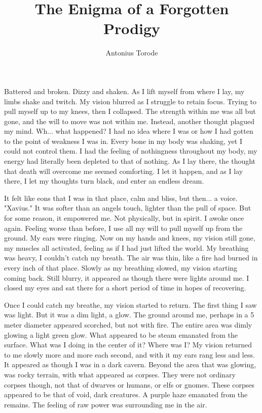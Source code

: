 \documentclass[11pt]{article}
\title{The Enigma of a Forgotten Prodigy}
\author{Antonius Torode}
\begin{document}
\maketitle
\thispagestyle{fancy}

Battered and broken. Dizzy and shaken. As I lift myself from where I lay, my limbs shake and twitch. My vision blurred as I struggle to retain focus. Trying to pull myself up to my knees, then I collapsed. The strength within me was all but gone, and the will to move was not within me. Instead, another thought plagued my mind. Wh... what happened? I had no idea where I was or how I had gotten to the point of weakness I was in. Every bone in my body was shaking, yet I could not control them. I had the feeling of nothingness throughout my body, my energy had literally been depleted to that of nothing. As I lay there, the thought that death will overcome me seemed comforting. I let it happen, and as I lay there, I let my thoughts turn black, and enter an endless dream. 

It felt like eons that I was in that place, calm and bliss, but then... a voice. "Xavius." It was softer than an angels touch, lighter than the pull of space. But for some reason, it empowered me. Not physically, but in spirit. I awoke once again. Feeling worse than before, I use all my will to pull myself up from the ground. My ears were ringing. Now on my hands and knees, my vision still gone, my muscles all activated, feeling as if I had just lifted the world. My breathing was heavy, I couldn't catch my breath. The air was thin, like a fire had burned in every inch of that place. Slowly as my breathing slowed, my vision starting coming back. Still blurry, it appeared as though there were lights around me. I closed my eyes and sat there for a short period of time in hopes of recovering.

Once I could catch my breathe, my vision started to return. The first thing I saw was light. But it was a dim light, a glow. The ground around me, perhaps in a 5 meter diameter appeared scorched, but not with fire. The entire area was dimly glowing a light green glow. What appeared to be steam emanated from the surface. What was I doing in the center of it? Where was I? My vision returned to me slowly more and more each second, and with it my ears rang less and less. It appeared as though I was in a dark cavern. Beyond the area that was glowing, was rocky terrain, with what appeared as corpses. They were not ordinary corpses though, not that of dwarves or humans, or elfs or gnomes. These corpses appeared to be that of void, dark creatures. A purple haze emanated from the remains. The feeling of raw power was surrounding me in the air.
\end{document}
